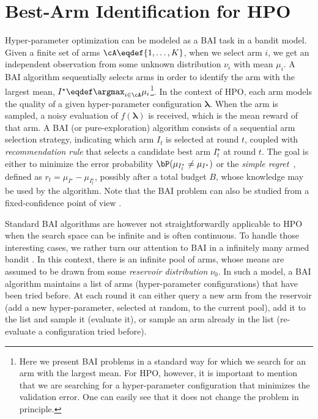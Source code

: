 \section{Best-Arm Identification for HPO}\label{sec:dttts.bai}

Hyper-parameter optimization can  be modeled as a BAI task in a bandit model. Given a finite set of arms $\cA \eqdef \{1,\ldots,K\}$,  when we select arm $i$, we get an independent observation from some unknown distribution $\nu_i$ with mean $\mu_i$. A BAI algorithm sequentially selects arms in order to identify the arm with the largest mean, $I^\star \eqdef \argmax_{i\in\cA}\mu_i$\footnote{Here we present BAI problems in a standard way for which we search for an arm with the largest mean. For HPO, however, it is important to mention that we are searching for a hyper-parameter configuration that minimizes the validation error. One can easily see that it does not change the problem in principle.}. In the context of HPO, each arm models the quality of a given hyper-parameter configuration $\bm\lambda$. When the arm is sampled, a noisy evaluation of $f(\bm\lambda)$ is received, which is the mean reward of that arm.
A BAI (or pure-exploration) algorithm consists of a sequential arm selection strategy, indicating which arm $I_t$ is selected at round $t$, coupled with \emph{recommendation rule} that selects a candidate best arm ${I}^\star_t$ at round $t$. The goal is either to minimize the error probability $\bP(\mu_{{I}^\star_t}\neq\mu_{I^\star})$ \citep{audibert2010budget,karnin2013sha} or the \emph{simple regret}~\citep{bubeck2009pure,gabillon2012ugape}, defined as 
$r_t = \mu_{I^\star} - \mu_{{I}^\star_t}$, possibly after a total budget $B$, whose knowledge may be used by the algorithm. Note that the BAI problem can also be studied from a fixed-confidence point of view \citep{even-dar2003confidence}. 

Standard BAI algorithms are however not straightforwardly applicable to HPO when the search space can be infinite and is often continuous. To handle those interesting cases, we rather turn our attention to BAI in a infinitely many armed bandit \citep{carpentier2015siri}. In this context, there is an infinite pool of arms, whose means are assumed to be drawn from some \emph{reservoir distribution} $\nu_0$. In such a model, a BAI algorithm maintains a list of arms (hyper-parameter configurations) that have been tried before. At each round it can either query a new arm from the reservoir (add a new hyper-parameter, selected at random, to the current pool), add it to the list and sample it (evaluate it), or sample an arm already in the list (re-evaluate a configuration tried before).     

